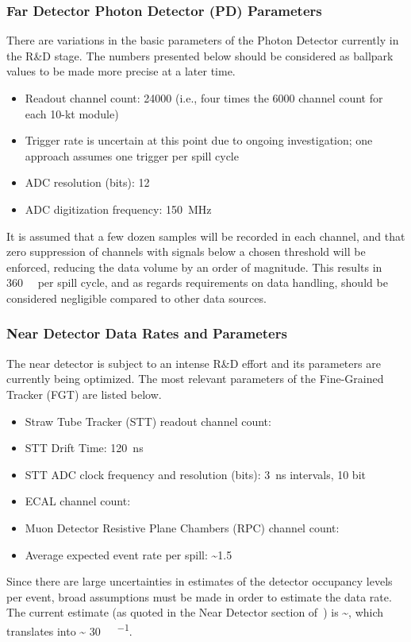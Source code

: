 \subsubsection{Far Detector Photon Detector (PD) Parameters}
There are variations in the basic parameters of the Photon Detector
currently in the R\&D stage. The numbers presented below should be
considered as ballpark values to be made more precise at a later time.
\begin{itemize}
\item Readout channel count: \num{24000} (i.e., four times the \num{6000} channel count for each 10-kt module)
\item Trigger rate is uncertain at this point due to ongoing
  investigation; one approach assumes one trigger per spill cycle
\item ADC resolution (bits): 12
\item ADC digitization frequency: \SI{150}{\MHz}
\end{itemize}
It is assumed that a few dozen samples will be recorded in each
channel, and that zero suppression of channels with signals
below a chosen threshold will be enforced, reducing the data volume by 
an order of magnitude.  This results in \SI{360}{\kilo\byte} per spill
cycle, and as regards requirements on data handling, should be considered negligible compared to other data sources.


\subsubsection{Near Detector Data Rates and Parameters}
The near detector is subject to an intense R\&D effort and
its parameters are currently being optimized. The
most relevant parameters of the Fine-Grained Tracker (FGT) are listed below.
\begin{itemize}
\item Straw Tube Tracker (STT) readout channel count: \ndsstchannels
\item STT Drift Time: 120~ns
\item STT ADC clock frequency and resolution (bits): \SI{3}{\ns} intervals, 10 bit
\item ECAL channel count: \ndecalchannels
\item Muon Detector Resistive Plane Chambers (RPC) channel count: \ndmuidchannels
\item Average expected event rate per spill: \textasciitilde 1.5
\end{itemize}
Since there are large uncertainties in estimates of the detector
occupancy levels per event, broad assumptions must be made in order to
estimate the data rate. The current estimate (as quoted in the Near
Detector section of~\cite{cdr-annex-rates}) is
\textasciitilde \nddatarate, which translates into \textasciitilde
\SI{30}{\tera\byte\per\year}.

